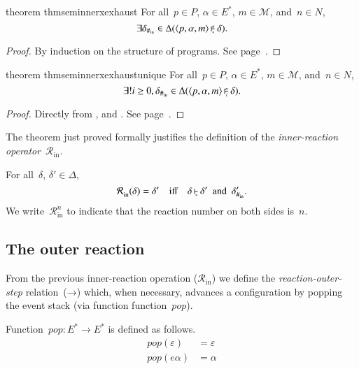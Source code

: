 \documentclass[10pt,a4paper,oneside,leqno]{article}
\makeatletter
\numberwithin{equation}{section}
\let\nil=\varepsilon
\def\<#1>{\langle#1\rangle}
\def\Hinner{{\#_{\mathrm{in}}}}
\newcommand\Rinner[1][]{{\mathcal{R}_{\mathrm{in}}^{#1}}}
\def\pop{\mathit{pop}}
\def\@inner#1#2{%
  \setbox0=\hbox{$\vdash$}%
  \setbox1=\hbox{$\scriptscriptstyle#1$}%
  \setbox2=\hbox{$\scriptscriptstyle#2$}%
  \ifdim\wd1>\wd2
    \setbox2=\hbox to\wd1{\hfil$\scriptscriptstyle#2$\hfil}%
  \else
    \setbox1=\hbox to\wd2{\hfil$\scriptscriptstyle#1$\hfil}%
  \fi
  \setbox3=\hbox{$\null^{\box1}_{\box2}$}%
  \dimen0=\wd3
  \rlap{\hbox{$\vrule height\the\ht0 depth\the\dp0 width.6pt
      \vcenter{\hrule height.3pt depth.3pt width\dimen0}$}}%
  \kern1pt\box3
}
\newcommand{\inner}[2][]{\mathbin{\@inner{#2}{#1}}}
\newcommand{\innerx}[1]{\inner[\ast]{#1}}
\newcommand{\outersym}{\mathord{\to}}
\makeatother
\begin{document}
\begin{restatable}[label={thm:sem:innerx:exhaust}]{theorem}
  {thmseminnerxexhaust}
  For all~$p\in{P}$, $\alpha\in{E^*}$, $m\in\mathcal{M}$, and~$n\in{N}$,
  \[
    \exists\delta_\Hinner\in\Delta(\<p,\alpha,m>\innerx{n}\delta).
  \]
\end{restatable}
\begin{proof}
  By induction on the structure of programs.  See
  page~\pageref{proof:thm:sem:innerx:exhaust}.
\end{proof}

\begin{restatable}[label={thm:sem:innerx:exhaust-unique}]{theorem}
  {thmseminnerxexhaustunique}
  For all~$p\in{P}$, $\alpha\in{E^*}$, $m\in\mathcal{M}$, and~$n\in{N}$,
  \[
    \exists!i\ge0,\delta_\Hinner\in\Delta(\<p,\alpha,m>\inner[i]{n}\delta).
  \]
\end{restatable}
\begin{proof}
  Directly from , and
  .  See
  page~\pageref{proof:thm:sem:innerx:exhaust-unique}.
\end{proof}

The theorem just proved formally justifies the definition of the
\emph{inner-reaction operator}~$\Rinner$.

\begin{definition}[name={Inner reaction},label={def:inner:R}]
  For all~$\delta$, $\delta'\in\Delta$,
  \[
    \Rinner(\delta)=\delta'
    \quad\text{iff}\quad
    \delta\innerx{}\delta'
    \enspace\text{and}\enspace
    \delta'_\Hinner.
  \]
  We write~$\Rinner[n]$ to indicate that the reaction number on both sides
  is~$n$.
\end{definition}


\subsection{The outer reaction}
\label{sub:sem:outer}

From the previous inner-reaction operation ($\Rinner$) we define the
\emph{reaction-outer-step} relation~($\outersym$) which, when necessary,
advances a configuration by popping the event stack (via function
function~$\pop$).

\begin{definition}[label={def:sem:pop}]
  Function~$\pop\colon{E^*}\to{E^*}$ is defined as follows.
  \begin{align*}
    \pop(\nil)&=\nil\\
    \pop(e\alpha)&=\alpha
  \end{align*}
\end{definition}
\end{document}
